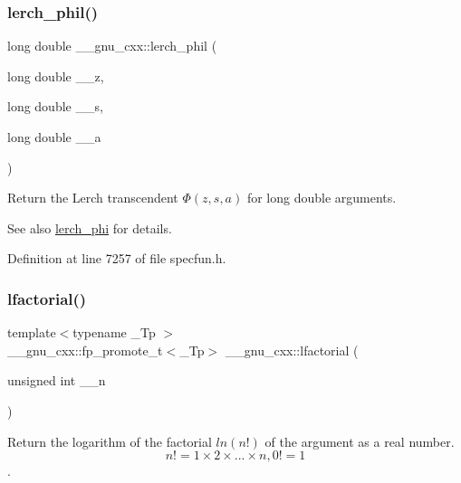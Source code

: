 \subsubsection{\texorpdfstring{lerch\+\_\+phil()}{lerch\_phil()}}
{\footnotesize\ttfamily long double \+\_\+\+\_\+gnu\+\_\+cxx\+::lerch\+\_\+phil (\begin{DoxyParamCaption}\item[{long double}]{\+\_\+\+\_\+z,  }\item[{long double}]{\+\_\+\+\_\+s,  }\item[{long double}]{\+\_\+\+\_\+a }\end{DoxyParamCaption})\hspace{0.3cm}{\ttfamily [inline]}}

Return the Lerch transcendent $ \Phi(z,s,a) $ for {\ttfamily  long double } arguments.

\begin{DoxySeeAlso}{See also}
\hyperlink{group__mathsf__gnu_ga31d7cfc601a99d72e58f654d0c890fd6}{lerch\+\_\+phi} for details. 
\end{DoxySeeAlso}


Definition at line 7257 of file specfun.\+h.

\mbox{\label{group__mathsf__gnu_gab256f8d7b77b9a8fefafca21827166eb}} 
\subsubsection{\texorpdfstring{lfactorial()}{lfactorial()}}
{\footnotesize\ttfamily template$<$typename \+\_\+\+Tp $>$ \\
\+\_\+\+\_\+gnu\+\_\+cxx\+::fp\+\_\+promote\+\_\+t$<$\+\_\+\+Tp$>$ \+\_\+\+\_\+gnu\+\_\+cxx\+::lfactorial (\begin{DoxyParamCaption}\item[{unsigned int}]{\+\_\+\+\_\+n }\end{DoxyParamCaption})\hspace{0.3cm}{\ttfamily [inline]}}



Return the logarithm of the factorial $ ln(n!) $ of the argument as a real number. \[ n! = 1 \times 2 \times ... \times n, 0! = 1 \]. 



